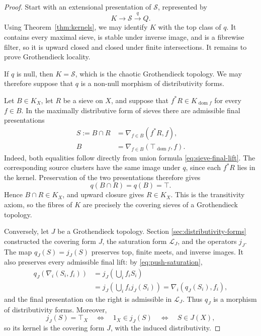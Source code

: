 \documentclass[12pt,oneside,reqno]{amsart}
\theoremstyle{definition}
\theoremstyle{remark}
\newcommand{\Sieve}{\mathscr S}
\newcommand{\Sat}{\mathscr L}
\begin{document}
\begin{proof}
Start with an extensional presentation of \(\Sieve\), represented by
\[
 K\longrightarrow\Sieve\xrightarrow{q}Q.
\]
Using Theorem~\ref{thm:kernels}, we may identify \(K\) with the top
class of \(q\).  It contains every maximal sieve, is stable under
inverse image, and is a fibrewise filter, so it is upward closed and
closed under finite intersections.  It remains to prove Grothendieck
locality.

If \(q\) is null, then \(K=\Sieve\), which is the chaotic
Grothendieck topology.  We may therefore suppose that \(q\) is a
non-null morphism of distributivity forms.

Let \(B\in K_X\), let \(R\) be a sieve on \(X\), and suppose that
\(f^*R\in K_{\operatorname{dom}f}\) for every \(f\in B\).  In the
maximally distributive form of sieves there are admissible final
presentations
\[
 \begin{aligned}
 S:=B\cap R
   &=\nabla_{f\in B}(f^*R,f),\\
 B&=\nabla_{f\in B}(\top_{\operatorname{dom}f},f).
 \end{aligned}
\]
Indeed, both equalities follow directly from union formula
\eqref{eq:sieve-final-lift}.  The corresponding source clusters have
the same image under \(q\), since each \(f^*R\) lies in the kernel.
Preservation of the two presentations therefore gives
\[
                         q(B\cap R)=q(B)=\top.
\]
Hence \(B\cap R\in K_X\), and upward closure gives \(R\in K_X\).
This is the transitivity axiom, so the fibres of \(K\) are precisely the
covering sieves of a Grothendieck topology.

Conversely, let \(J\) be a Grothendieck topology.  Section
\ref{sec:distributivity-forms} constructed the covering form \(J\), the
saturation form \(\Sat_J\), and the operators \(j_J\).  The map
\(q_J(S)=j_J(S)\) preserves top, finite meets, and inverse images.  It
also preserves every admissible final lift: by
\eqref{eq:push-saturation},
\[
 \begin{aligned}
 q_J\!\left(\nabla_i(S_i,f_i)\right)
 &=j_J\!\left(\bigcup_i f_iS_i\right)\\
 &=j_J\!\left(\bigcup_i f_i j_J(S_i)\right)
  =\nabla_i(q_J(S_i),f_i),
 \end{aligned}
\]
and the final presentation on the right is admissible in \(\Sat_J\).
Thus \(q_J\) is a morphism of distributivity forms.  Moreover,
\[
 j_J(S)=\top_X
 \quad\Longleftrightarrow\quad
 1_X\in j_J(S)
 \quad\Longleftrightarrow\quad
 S\in J(X),
\]
so its kernel is the covering form \(J\), with the induced
distributivity.


\end{proof}
\end{document}
